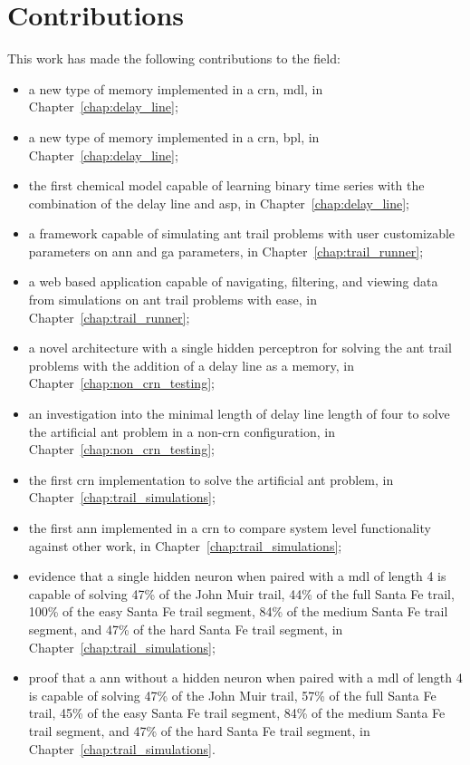 \section{Contributions}
This work has made the following contributions to the field:
\begin{itemize}
\item a new type of memory implemented in a \acrlong{crn}, \acrlong{mdl}, in Chapter~\ref{chap:delay_line};
\item a new type of memory implemented in a \acrlong{crn}, \acrlong{bpl}, in Chapter~\ref{chap:delay_line};
\item the first chemical model capable of learning binary time series with the combination of the delay line and \acrlong{asp}, in Chapter~\ref{chap:delay_line};
\item a framework capable of simulating ant trail problems with user customizable parameters on \acrlong{ann} and \acrlong{ga} parameters, in Chapter~\ref{chap:trail_runner};
\item a web based application capable of navigating, filtering, and viewing data from simulations on ant trail problems with ease, in Chapter~\ref{chap:trail_runner};
\item a novel architecture with a single hidden perceptron for solving the ant trail problems with the addition of a delay line as a memory, in Chapter~\ref{chap:non_crn_testing};
\item an investigation into the minimal length of delay line length of four to solve the artificial ant problem in a non-\acrlong{crn} configuration, in Chapter~\ref{chap:non_crn_testing};
\item the first \acrlong{crn} implementation to solve the artificial ant problem, in Chapter~\ref{chap:trail_simulations};
\item the first \acrlong{ann} implemented in a \acrlong{crn} to compare system level functionality against other work, in Chapter~\ref{chap:trail_simulations};
\item evidence that a single hidden neuron when paired with a \acrlong{mdl} of length 4 is capable of solving 47\% of the John Muir trail, 44\% of the full Santa Fe trail, 100\% of the easy Santa Fe trail segment, 84\% of the medium Santa Fe trail segment, and 47\% of the hard Santa Fe trail segment, in Chapter~\ref{chap:trail_simulations};
\item proof that a \acrlong{ann} without a hidden neuron when paired with a \acrlong{mdl} of length 4 is capable of solving 47\% of the John Muir trail, 57\% of the full Santa Fe trail, 45\% of the easy Santa Fe trail segment, 84\% of the medium Santa Fe trail segment, and 47\% of the hard Santa Fe trail segment, in Chapter~\ref{chap:trail_simulations}.
\end{itemize}

